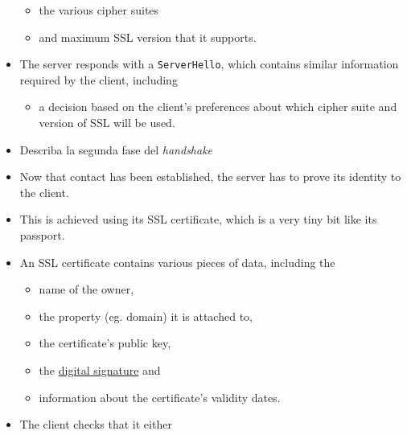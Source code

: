 \begin{itemize}
  \begin{itemize}
  \itemsep1pt\parskip0pt
  \item
    the various cipher suites
  \item
    and maximum SSL version that it supports.
  \end{itemize}
\item
  The server responds with a \texttt{ServerHello}, which contains
  similar information required by the client, including

  \begin{itemize}
  \itemsep1pt\parskip0pt
  \item
    a decision based on the client's preferences about which cipher
    suite and version of SSL will be used.
  \end{itemize}
\item
  Describa la segunda fase del \emph{handshake}
\item
  Now that contact has been established, the server has to prove its
  identity to the client.
\item
  This is achieved using its SSL certificate, which is a very tiny bit
  like its passport.
\item
  An SSL certificate contains various pieces of data, including the

  \begin{itemize}
  \itemsep1pt\parskip0pt
  \item
    name of the owner,
  \item
    the property (eg. domain) it is attached to,
  \item
    the certificate's public key,
  \item
    the \href{https://en.wikipedia.org/wiki/Digital_signature}{digital
    signature} and
  \item
    information about the certificate's validity dates.
  \end{itemize}
\item
  The client checks that it either


\end{itemize}
